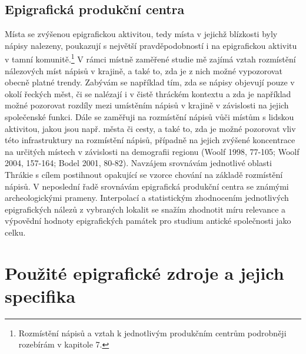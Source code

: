 \subsection[epigrafická-produkční-centra]{Epigrafická produkční centra}

Místa se zvýšenou epigrafickou aktivitou, tedy místa v jejichž blízkosti byly nápisy nalezeny, poukazují s největší pravděpodobností i na epigrafickou aktivitu v tamní komunitě.\footnote{Rozmístění nápisů a vztah k jednotlivým produkčním centrům podrobněji rozebírám v kapitole 7.} V rámci místně zaměřené studie mě zajímá vztah rozmístění nálezových míst nápisů v krajině, a také to, zda je z nich možné vypozorovat obecně platné trendy. Zabývám se například tím, zda se nápisy objevují pouze v okolí řeckých měst, či se nalézají i v čistě thráckém kontextu a zda je například možné pozorovat rozdíly mezi umístěním nápisů v krajině v závislosti na jejich společenské funkci. Dále se zaměřuji na rozmístění nápisů vůči místům s lidskou aktivitou, jakou jsou např. města či cesty, a také to, zda je možné pozorovat vliv této infrastruktury na rozmístění nápisů, případně na jejich zvýšené koncentrace na určitých místech v závislosti na demografii regionu (Woolf 1998, 77-105; Woolf 2004, 157-164; Bodel 2001, 80-82). Navzájem srovnávám jednotlivé oblasti Thrákie s cílem postihnout opakující se vzorce chování na základě rozmístění nápisů. V neposlední řadě srovnávám epigrafická produkční centra se známými archeologickými prameny. Interpolací a statistickým zhodnocením jednotlivých epigrafických nálezů z vybraných lokalit se snažím zhodnotit míru relevance a výpovědní hodnoty epigrafických památek pro studium antické společnosti jako celku.

\section[použité-epigrafické-zdroje-a-jejich-specifika]{Použité epigrafické zdroje a jejich specifika}

